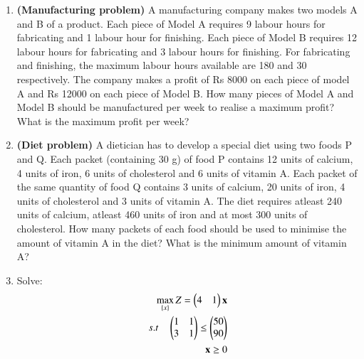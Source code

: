 \begin{enumerate}[label=\arabic*.,ref=\thesection.\theenumi]
\item  \textbf{(Manufacturing problem)} A manufacturing company makes two models
A and B of a product. Each piece of Model A requires 9 labour hours for fabricating
and 1 labour hour for finishing. Each piece of Model B requires 12 labour hours for
fabricating and 3 labour hours for finishing. For fabricating and finishing, the maximum
labour hours available are 180 and 30 respectively. The company makes a profit of
Rs 8000 on each piece of model A and Rs 12000 on each piece of Model B. How many
pieces of Model A and Model B should be manufactured per week to realise a maximum
profit? What is the maximum profit per week?\\
\item \textbf {(Diet problem)} A dietician has to develop a special diet using two foods
P and Q. Each packet (containing 30 g) of food P contains 12 units of calcium, 4 units
of iron, 6 units of cholesterol and 6 units of vitamin A. Each packet of the same quantity
of food Q contains 3 units of calcium, 20 units of iron, 4 units of cholesterol and 3 units
of vitamin A. The diet requires atleast 240 units of calcium, atleast 460 units of iron and
at most 300 units of cholesterol. How many packets of each food should be used to
minimise the amount of vitamin A in the diet? What is the minimum amount of vitamin A?\\
\item Solve:
\begin{align}
    \max_{\{x\}} Z=\myvec{4 & 1}\vec{x}\label{eq:solutions/4/38/eq:1}\\
    s.t\quad \myvec{1 & 1\\3 & 1} \leq \myvec{50\\90}\label{eq:solutions/4/38/eq:2}\\
    \Vec{x}\geq 0 \label{eq:solutions/4/38/eq:3}
\end{align}
\solution

\end{enumerate}
%
